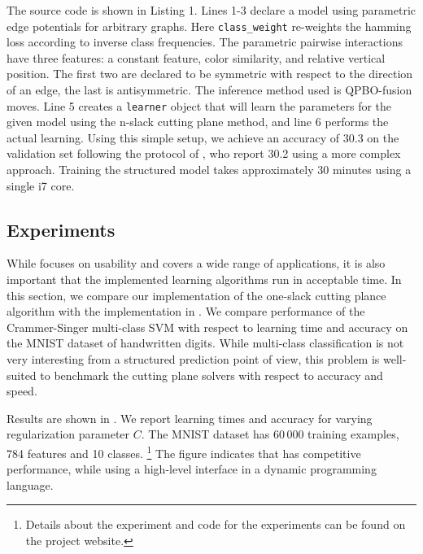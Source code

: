 The source code is shown in Listing 1.
Lines 1-3 declare a model using parametric edge potentials for arbitrary graphs.
Here \texttt{class\_weight} re-weights the hamming loss according to inverse class
frequencies. The parametric pairwise interactions have three features: a
constant feature, color similarity, and relative vertical position. The first two
are declared to be symmetric with respect to the direction of an edge, the last
is antisymmetric. The inference method used is QPBO-fusion moves.  Line 5
creates a \texttt{learner} object that will learn the parameters for the given
model using the n-slack cutting plane method, and line 6 performs the actual
learning.  Using this simple setup, we achieve an accuracy of 30.3 on the
validation set following the protocol of \citet{krahenbuhl2012efficient}, who
report 30.2 using a more complex approach. Training the structured model takes
approximately 30 minutes using a single i7 core.

\subsection{Experiments}\label{sec:benchmarks}
While \pystruct focuses on usability and covers a wide range of applications, it is also
important that the implemented learning algorithms run in acceptable time.
In this section, we compare our implementation of the one-slack cutting plance
algorithm with the implementation in \svmstruct.
We compare performance of the Crammer-Singer multi-class SVM with respect to
learning time and accuracy on the MNIST dataset of handwritten digits.
While multi-class classification is not very interesting from a structured
prediction point of view, this problem is well-suited to benchmark the cutting
plane solvers with respect to accuracy and speed.

Results are shown in . We report learning times and accuracy for
varying regularization parameter $C$. The MNIST dataset has 60\,000 training
examples, 784 features and 10 classes.%
\footnote{Details about the experiment and code for the experiments can be found on the project website.}
The figure indicates that \pystruct has competitive performance, while using
a high-level interface in a dynamic programming language.

